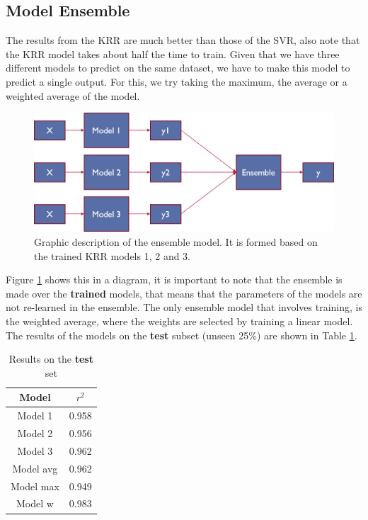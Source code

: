 \subsection{Model Ensemble}

The results from the KRR are much better than those of the SVR, also note that the KRR model takes about half the time to train. Given that we have three different models to predict on the same dataset, we have to make this model to predict a single output. For this, we try taking the maximum, the average or a weighted average of the model. 
\begin{figure}[h!]
	\centering
	\includegraphics[width=1\linewidth]{TeX_files/Imagenes/ensemble_model}
	\caption{Graphic description of the ensemble model. It is formed based on the trained KRR models 1, 2 and 3.}
	\label{fig:ensemblemodel}
\end{figure}

Figure \ref{fig:ensemblemodel} shows this in a diagram, it is important to note that the ensemble is made over the \textbf{trained} models, that means that the parameters of the models are not re-learned in the ensemble. The only ensemble model that involves training, is the weighted average, where the weights are selected by training a linear model. The results of the models on the \textbf{test} subset (unseen 25\%) are shown in Table \ref{table:test-result}. 

\begin{table}[h!]
	\centering
	\begin{tabular}{|c|c|}
		\hline 
		Model & $r^2$ \\ 
		\hline 
		Model 1 & 0.958 \\ 
		\hline 
		Model 2 & 0.956 \\ 
		\hline 
		Model 3 & 0.962 \\ 
		\hline 
		Model avg & 0.962 \\ 
		\hline 
		Model max & 0.949 \\ 
		\hline 
		Model w & 0.983 \\ 
		\hline 
	\end{tabular} 
	\caption{Results on the \textbf{test} set}
	\label{table:test-result}
\end{table}

